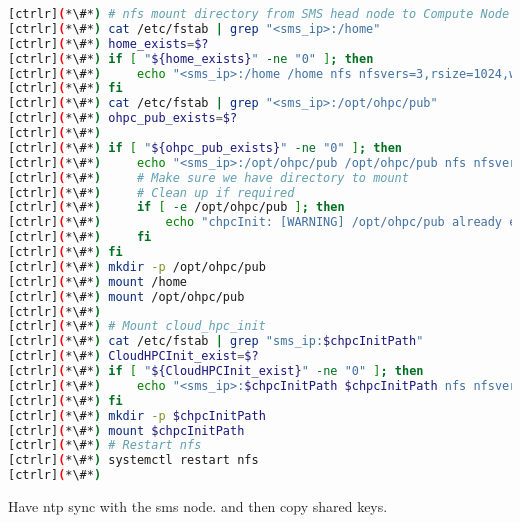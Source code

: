 \begin{lstlisting}[language=bash,keywords={}]
[ctrlr](*\#*) # nfs mount directory from SMS head node to Compute Node
[ctrlr](*\#*) cat /etc/fstab | grep "<sms_ip>:/home"
[ctrlr](*\#*) home_exists=$?
[ctrlr](*\#*) if [ "${home_exists}" -ne "0" ]; then
[ctrlr](*\#*)     echo "<sms_ip>:/home /home nfs nfsvers=3,rsize=1024,wsize=1024,cto 0 0" >> /etc/fstab
[ctrlr](*\#*) fi
[ctrlr](*\#*) cat /etc/fstab | grep "<sms_ip>:/opt/ohpc/pub"
[ctrlr](*\#*) ohpc_pub_exists=$?
[ctrlr](*\#*) 
[ctrlr](*\#*) if [ "${ohpc_pub_exists}" -ne "0" ]; then
[ctrlr](*\#*)     echo "<sms_ip>:/opt/ohpc/pub /opt/ohpc/pub nfs nfsvers=3 0 0" >> /etc/fstab
[ctrlr](*\#*)     # Make sure we have directory to mount
[ctrlr](*\#*)     # Clean up if required
[ctrlr](*\#*)     if [ -e /opt/ohpc/pub ]; then
[ctrlr](*\#*)         echo "chpcInit: [WARNING] /opt/ohpc/pub already exists!!"
[ctrlr](*\#*)     fi
[ctrlr](*\#*) fi
[ctrlr](*\#*) mkdir -p /opt/ohpc/pub
[ctrlr](*\#*) mount /home
[ctrlr](*\#*) mount /opt/ohpc/pub
[ctrlr](*\#*) 
[ctrlr](*\#*) # Mount cloud_hpc_init
[ctrlr](*\#*) cat /etc/fstab | grep "sms_ip:$chpcInitPath"
[ctrlr](*\#*) CloudHPCInit_exist=$?
[ctrlr](*\#*) if [ "${CloudHPCInit_exist}" -ne "0" ]; then
[ctrlr](*\#*)     echo "<sms_ip>:$chpcInitPath $chpcInitPath nfs nfsvers=3 0 0" >> /etc/fstab
[ctrlr](*\#*) fi
[ctrlr](*\#*) mkdir -p $chpcInitPath
[ctrlr](*\#*) mount $chpcInitPath
[ctrlr](*\#*) # Restart nfs
[ctrlr](*\#*) systemctl restart nfs
[ctrlr](*\#*) 
\end{lstlisting}

	Have ntp sync with the sms node. and then copy shared keys.


